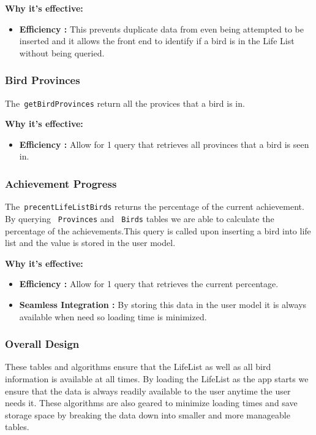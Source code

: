 \documentclass{article}
\begin{document}
\textbf{Why it's effective:}
\begin{itemize}
    \item \textbf{Efficiency :} This prevents duplicate data from even being attempted to be inserted and it allows the front end to identify if a bird is in the Life List without being queried.
\end{itemize}

\subsubsection{Bird Provinces}
The\texttt{\ getBirdProvinces} return all the provices that a bird is in.

\textbf{Why it's effective:}
\begin{itemize}
    \item \textbf{Efficiency :} Allow for 1 query that retrieves all provinces that a bird is seen in.
\end{itemize}

\subsubsection{Achievement Progress}
The\texttt{\ precentLifeListBirds} returns the percentage of the current achievement. By querying \texttt{\ Provinces} and \texttt{\ Birds} tables we are able to calculate the percentage of the achievements.This query is called upon inserting a bird into life list and the value is stored in the user model.

\textbf{Why it's effective:}
\begin{itemize}
    \item \textbf{Efficiency :} Allow for 1 query that retrieves the current percentage.
    \item  \textbf{Seamless Integration :} By storing this data in the user model it is always available when need so loading time is minimized.
\end{itemize}

\subsubsection{Overall Design}
These tables and algorithms ensure that the LifeList as well as all bird information is available at all times. By loading the LifeList as the app starts we ensure that the data is always readily available to the user anytime the user needs it. These algorithms are also geared to minimize loading times and save storage space by breaking the data down into smaller and more manageable tables. 
\end{document}
